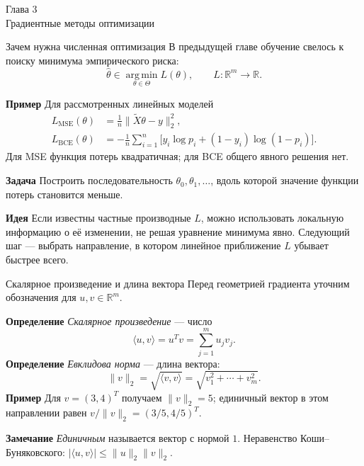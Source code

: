 \documentclass[10pt]{beamer}
\newcommand{\dblue}[1]{\textcolor{defblue}{#1}}
\newcommand{\chapterframe}[2]{%
    \begin{frame}
        \vfill
        \begin{center}
            {\Large \dblue{Глава #1}}\\[0.65em]
            {\LARGE #2}
        \end{center}
        \vfill
    \end{frame}
}
\newcommand{\mlBody}{\normalsize}
\newcommand{\mlDefinition}{\textcolor{defblue}{\bfseries Определение}}
\newcommand{\mlRemark}{\textcolor{defblue}{\bfseries Замечание}}
\newcommand{\mlIdea}{\textcolor{defblue}{\bfseries Идея}}
\newcommand{\mlTask}{\textcolor{defblue}{\bfseries Задача}}
\newcommand{\mlExample}{\textcolor{defblue}{\bfseries Пример}}
\begin{document}
\chapterframe{3}{Градиентные методы оптимизации}
\begin{frame}{Зачем нужна численная оптимизация}
    \mlBody
    В предыдущей главе обучение свелось к поиску минимума
    эмпирического риска:
    \[
        \boxed{\hat\theta\in\operatorname*{arg\,min}_{\theta\in\Theta}L(\theta)},
        \qquad L:\mathbb R^m\to\mathbb R.
    \]

    \mlExample\; Для рассмотренных линейных моделей
    \[
    \begin{aligned}
        L_{\mathrm{MSE}}(\theta)&=\frac1n\|\widetilde X\theta-y\|_2^2,\\
        L_{\mathrm{BCE}}(\theta)&=-\frac1n\sum_{i=1}^n
        \bigl[y_i\log p_i+(1-y_i)\log(1-p_i)\bigr].
    \end{aligned}
    \]
    Для MSE функция потерь квадратичная; для BCE общего явного решения нет.

    \mlTask\; Построить последовательность $\theta_0,\theta_1,\ldots$,
    вдоль которой значение функции потерь становится меньше.

    \mlIdea\; Если известны частные производные $L$, можно использовать
    локальную информацию о её изменении, не решая уравнение минимума явно.
    Следующий шаг --- выбрать направление, в котором линейное
    приближение $L$ убывает быстрее всего.
\end{frame}



\begin{frame}{Скалярное произведение и длина вектора}
\mlBody
Перед геометрией градиента уточним обозначения для
$u,v\in\mathbb R^m$.

\mlDefinition\; \textit{Скалярное произведение} --- число
\[
    \boxed{\langle u,v\rangle=u^Tv=\sum_{j=1}^m u_jv_j}.
\]
\mlDefinition\; \textit{Евклидова норма} --- длина вектора:
\[
    \boxed{\|v\|_2=\sqrt{\langle v,v\rangle}
    =\sqrt{v_1^2+\cdots+v_m^2}}.
\]
\mlExample\; Для $v=(3,4)^T$ получаем $\|v\|_2=5$;
единичный вектор в этом направлении равен $v/\|v\|_2=(3/5,4/5)^T$.

\mlRemark\; \textit{Единичным} называется вектор с нормой $1$.
Неравенство Коши--Буняковского:
$|\langle u,v\rangle|\le\|u\|_2\|v\|_2$.
\end{frame}
\end{document}

